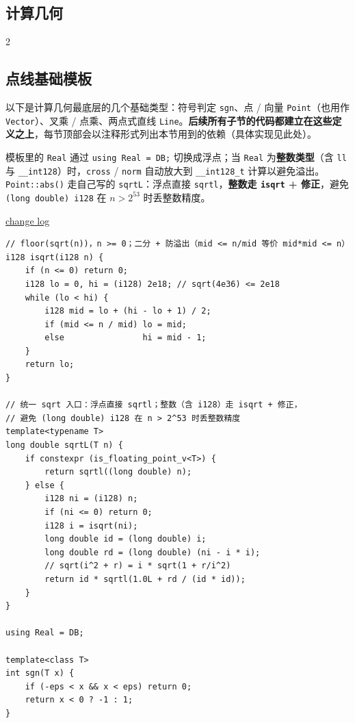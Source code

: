 	\begin{center}
		\section{计算几何}
	\end{center}

	\begin{multicols*}{2}

		\subsection{点线基础模板}

		以下是计算几何最底层的几个基础类型：符号判定 \texttt{sgn}、点 / 向量 \texttt{Point}（也用作 \texttt{Vector}）、叉乘 / 点乘、两点式直线 \texttt{Line}。\textbf{后续所有子节的代码都建立在这些定义之上}，每节顶部会以注释形式列出本节用到的依赖（具体实现见此处）。

		模板里的 \texttt{Real} 通过 \texttt{using Real = DB;} 切换成浮点；当 \texttt{Real} 为\textbf{整数类型}（含 \texttt{ll} 与 \texttt{\_\_int128}）时，\texttt{cross} / \texttt{norm} 自动放大到 \texttt{\_\_int128\_t} 计算以避免溢出。\texttt{Point::abs()} 走自己写的 \texttt{sqrtL}：浮点直接 \texttt{sqrtl}，\textbf{整数走 \texttt{isqrt} + 修正}，避免 \texttt{(long double)\,i128} 在 $n > 2^{53}$ 时丢整数精度。

		\href{https://gist.github.com/znzryb/11d094702ccdb989efb8aed573ab0885}{change log}

		\begin{verbatim}
// floor(sqrt(n))，n >= 0；二分 + 防溢出（mid <= n/mid 等价 mid*mid <= n）
i128 isqrt(i128 n) {
	if (n <= 0) return 0;
	i128 lo = 0, hi = (i128) 2e18; // sqrt(4e36) <= 2e18
	while (lo < hi) {
		i128 mid = lo + (hi - lo + 1) / 2;
		if (mid <= n / mid) lo = mid;
		else                hi = mid - 1;
	}
	return lo;
}

// 统一 sqrt 入口：浮点直接 sqrtl；整数（含 i128）走 isqrt + 修正，
// 避免 (long double) i128 在 n > 2^53 时丢整数精度
template<typename T>
long double sqrtL(T n) {
	if constexpr (is_floating_point_v<T>) {
		return sqrtl((long double) n);
	} else {
		i128 ni = (i128) n;
		if (ni <= 0) return 0;
		i128 i = isqrt(ni);
		long double id = (long double) i;
		long double rd = (long double) (ni - i * i);
		// sqrt(i^2 + r) = i * sqrt(1 + r/i^2)
		return id * sqrtl(1.0L + rd / (id * id));
	}
}

using Real = DB;

template<class T>
int sgn(T x) {
	if (-eps < x && x < eps) return 0;
	return x < 0 ? -1 : 1;
}


\end{verbatim}
\end{multicols*}
